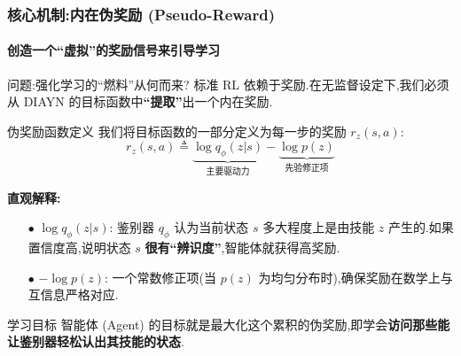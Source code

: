 \documentclass{beamer}
\begin{document}
\begin{frame}
    \tiny
    \frametitle{核心机制:内在伪奖励 (Pseudo-Reward)}
    \framesubtitle{创造一个“虚拟”的奖励信号来引导学习}

    \begin{block}{问题:强化学习的“燃料”从何而来?}
        标准 RL 依赖于奖励.在无监督设定下,我们必须从 DIAYN 的目标函数中\textbf{“提取”}出一个内在奖励.
    \end{block}

    \begin{exampleblock}{伪奖励函数定义}
        我们将目标函数的一部分定义为每一步的奖励 $r_z(s, a)$:
        \[
            r_z(s, a) \triangleq \underbrace{\log q_\phi(z | s)}_{\text{主要驱动力}} - \underbrace{\log p(z)}_{\text{先验修正项}}
        \]
        
        \textbf{直观解释:}
        \begin{itemize}
            \item[$\bullet$] $\log q_\phi(z|s)$: 鉴别器 $q_\phi$ 认为当前状态 $s$ 多大程度上是由技能 $z$ 产生的.如果置信度高,说明状态 $s$ \textbf{很有“辨识度”},智能体就获得高奖励.
            \item[$\bullet$] $-\log p(z)$: 一个常数修正项(当 $p(z)$ 为均匀分布时),确保奖励在数学上与互信息严格对应.
        \end{itemize}
    \end{exampleblock}

    \begin{alertblock}{学习目标}
        智能体 (Agent) 的目标就是最大化这个累积的伪奖励,即学会\textbf{访问那些能让鉴别器轻松认出其技能的状态}.
    \end{alertblock}

\end{frame}
\end{document}
